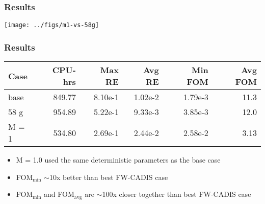 \documentclass[xcolor=x11names,compress]{beamer}
\renewcommand{\(}{\begin{columns}}
\renewcommand{\)}{\end{columns}}
\newcommand{\<}[1]{\begin{column}{#1}}
\renewcommand{\>}{\end{column}}
\begin{document}
\begin{frame}[fragile]
  \frametitle{Results}
    \begin{center}
  \texttt{[image: ../figs/m1-vs-58g]}  
  \end{center}
\end{frame}

\begin{frame}[fragile]
  \frametitle{Results}

	\begin{table}[p]
 	 \label{tab:comparison}
  	\begin{center}
    \begin{tabular}{|l|r|r|r|r|r|}\hline
      Case & CPU-hrs & Max RE & Avg RE & Min FOM & Avg FOM\\\hline
base & 849.77 & 8.10e-1 & 1.02e-2 & 1.79e-3 & 11.3\\
%
58 g & 954.89 & 5.22e-1 & 9.33e-3 & 3.85e-3 & 12.0\\
%
M = 1 & 534.80 & 2.69e-1 & 2.44e-2 & 2.58e-2 & 3.13\\\hline
    \end{tabular}
 	 \end{center}
	\end{table}

	\begin{itemize}
	\item M = 1.0 used the same deterministic parameters as the base case
	\item FOM$_{\min}$ $\sim$10x better than best FW-CADIS case
	\item FOM$_{\min}$ and FOM$_{\text{avg}}$ are $\sim$100x closer together than best FW-CADIS case
	\end{itemize}

\end{frame}
%
%
\end{document}

